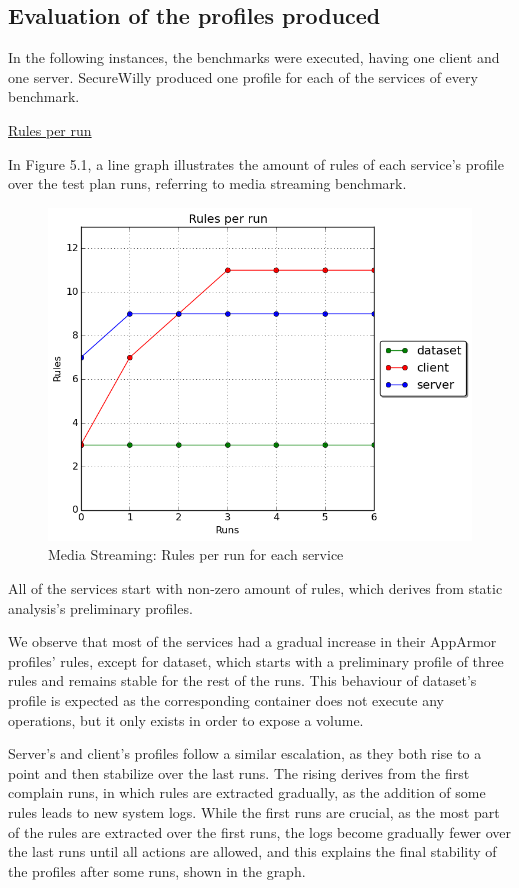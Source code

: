 \subsection{Evaluation of the profiles produced}

In the following instances, the benchmarks were executed, having one client and one server. SecureWilly produced one profile for each of the services of every benchmark.
\hfill\break

\underline{Rules per run}
\hfill\break

In Figure 5.1, a line graph illustrates the amount of rules of each service's profile over the test plan runs, referring to media streaming benchmark.

\begin{figure}[h!]
  \centering
   \includegraphics[width=0.8\linewidth]{./figures/mediastreaming/rules.png}
   \caption{Media Streaming: Rules per run for each service}
\end{figure}

All of the services start with non-zero amount of rules, which derives from static analysis's preliminary profiles.

We observe that most of the services had a gradual increase in their AppArmor profiles' rules, except for dataset, which starts with a preliminary profile of three rules and remains stable for the rest of the runs. This behaviour of dataset's profile is expected as the corresponding container does not execute any operations, but it only exists in order to expose a volume.

Server's and client's profiles follow a similar escalation, as they both rise to a point and then stabilize over the last runs. The rising derives from the first complain runs, in which rules are extracted gradually, as the addition of some rules leads to new system logs. While the first runs are crucial, as the most part of the rules are extracted over the first runs, the logs become gradually fewer over the last runs until all actions are allowed, and this explains the final stability of the profiles after some runs, shown in the graph.

